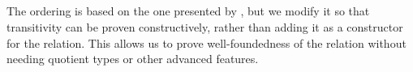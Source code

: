 \begin{code}
\AgdaSymbol{:}\AgdaSpace{}%
%
\>[23]\AgdaSymbol{\{}\AgdaSymbol{\}}\AgdaSpace{}%
\AgdaSymbol{\{}\AgdaSpace{}%
\AgdaSymbol{:}\AgdaSpace{}%
\AgdaSymbol{\}}\<%
\\
\>[6][@{}l@{\AgdaIndent{0}}]%
\>[8]\AgdaSpace{}%
\AgdaSymbol{(}\AgdaSpace{}%
\AgdaSymbol{:}\AgdaSpace{}%
\AgdaSpace{}%
\AgdaSpace{}%
\AgdaSpace{}%
\AgdaSymbol{)}\<%
\\
%
\>[8]\AgdaSpace{}%
\AgdaSpace{}%
\AgdaSpace{}%
\AgdaSpace{}%
\AgdaSpace{}%
\AgdaSpace{}%
\AgdaSpace{}%
\AgdaSymbol{)}\<%
\\
%
\>[8]\AgdaSpace{}%
\AgdaSpace{}%
\AgdaSpace{}%
\AgdaSpace{}%
\AgdaSpace{}%
\<%
\\
\>[0]\<%
\end{code}
The ordering is based on the one presented by \citet{KRAUS2023113843}, but we modify it
so that transitivity can be proven constructively, rather than adding it as a constructor
for the relation. This allows us to prove well-foundedness of the relation without needing
quotient types or other advanced features.

\begin{code}%
\>[0]\<%
\\
\>[0][@{}l@{\AgdaIndent{1}}]%
\>[4]\AgdaSpace{}%
\AgdaSymbol{:}\AgdaSpace{}%
\AgdaSpace{}%
\AgdaSpace{}%
\AgdaSpace{}%
\AgdaSpace{}%
\AgdaSpace{}%
\<%
\\
%
\>[4]\AgdaSpace{}%
\AgdaSpace{}%
\AgdaSymbol{=}\AgdaSpace{}%
\<%
\\
%
\>[4]\AgdaSpace{}%
\AgdaSymbol{(}\AgdaSpace{}%
\AgdaSymbol{)}\AgdaSpace{}%
\AgdaSymbol{=}\AgdaSpace{}%
\AgdaSpace{}%
\AgdaSymbol{(}\AgdaSpace{}%
\AgdaSymbol{)}\<%
\\
%
\>[4]\AgdaSpace{}%
\AgdaSymbol{(}\AgdaSpace{}%
\AgdaSpace{}%
\AgdaSymbol{)}\AgdaSpace{}%
\AgdaSymbol{=}\AgdaSpace{}%
\AgdaSpace{}%
\AgdaSpace{}%
\AgdaSpace{}%
\AgdaSpace{}%
\AgdaSpace{}%
\AgdaSpace{}%
\AgdaSpace{}%
\AgdaSpace{}%
\AgdaSymbol{(}\AgdaSpace{}%
\AgdaSymbol{(}\AgdaSpace{}%
\AgdaSymbol{)))}\<%
\\
\>[0]\<%
\end{code}

